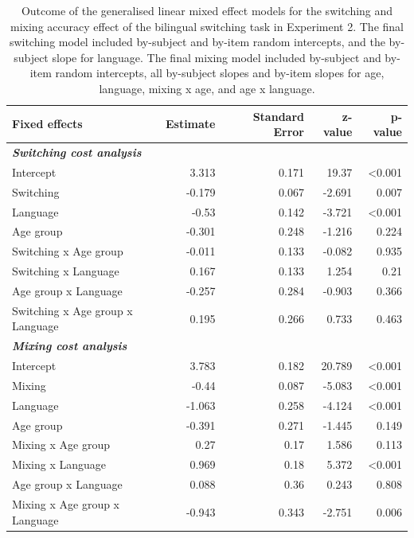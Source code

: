 \documentclass[
]{article}
\begin{document}
\newpage

\begin{table}

\caption{\label{tab:TableS8}Outcome of the generalised linear mixed effect models for the switching and mixing accuracy effect of the bilingual switching task in Experiment 2. The final switching model included by-subject and by-item random intercepts, and the by-subject slope for language. The final mixing model included by-subject and by-item random intercepts, all by-subject slopes and by-item slopes for age, language, mixing x age, and age x language.}
\centering
\begin{tabular}[t]{lrrrr}
\toprule
\textbf{Fixed effects} & \textbf{Estimate} & \textbf{Standard Error} & \textbf{z-value} & \textbf{p-value}\\
\midrule
\em{\textbf{Switching cost analysis}} & \em{\textbf{}} & \em{\textbf{}} & \em{\textbf{}} & \em{\textbf{}}\\
Intercept & 3.313 & 0.171 & 19.37 & <0.001\\
Switching & -0.179 & 0.067 & -2.691 & 0.007\\
Language & -0.53 & 0.142 & -3.721 & <0.001\\
Age group & -0.301 & 0.248 & -1.216 & 0.224\\
\addlinespace
Switching x Age group & -0.011 & 0.133 & -0.082 & 0.935\\
Switching x Language & 0.167 & 0.133 & 1.254 & 0.21\\
Age group x Language & -0.257 & 0.284 & -0.903 & 0.366\\
Switching x Age group x Language & 0.195 & 0.266 & 0.733 & 0.463\\
\em{\textbf{Mixing cost analysis}} & \em{\textbf{}} & \em{\textbf{}} & \em{\textbf{}} & \em{\textbf{}}\\
\addlinespace
Intercept & 3.783 & 0.182 & 20.789 & <0.001\\
Mixing & -0.44 & 0.087 & -5.083 & <0.001\\
Language & -1.063 & 0.258 & -4.124 & <0.001\\
Age group & -0.391 & 0.271 & -1.445 & 0.149\\
Mixing x Age group & 0.27 & 0.17 & 1.586 & 0.113\\
\addlinespace
Mixing x Language & 0.969 & 0.18 & 5.372 & <0.001\\
Age group x Language & 0.088 & 0.36 & 0.243 & 0.808\\
Mixing x Age group x Language & -0.943 & 0.343 & -2.751 & 0.006\\
\bottomrule
\end{tabular}
\end{table}
\end{document}

